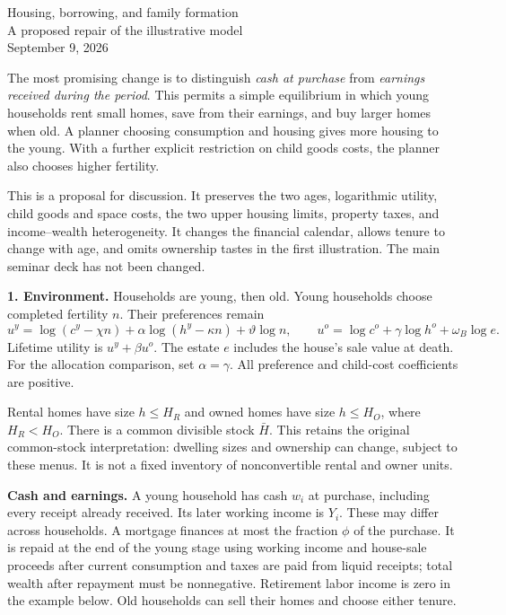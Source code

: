 \documentclass[11pt]{article}
\begin{document}
\begin{center}
{\Large Housing, borrowing, and family formation}\\[4pt]
{\large A proposed repair of the illustrative model}\\[4pt]
September 9, 2026
\end{center}

The most promising change is to distinguish \emph{cash at purchase} from
\emph{earnings received during the period}. This permits a simple equilibrium
in which young households rent small homes, save from their earnings, and buy
larger homes when old. A planner choosing consumption and housing gives more
housing to the young. With a further explicit restriction on child goods
costs, the planner also chooses higher fertility.

This is a proposal for discussion. It preserves the two ages, logarithmic
utility, child goods and space costs, the two upper housing limits, property
taxes, and income--wealth heterogeneity. It changes the financial calendar,
allows tenure to change with age, and omits ownership tastes in the first
illustration. The main seminar deck has not been changed.

\textbf{1. Environment.}
Households are young, then old. Young households choose completed fertility
$n$. Their preferences remain
\[
u^y=\log(c^y-\chi n)+\alpha\log(h^y-\kappa n)+\vartheta\log n,
\qquad
u^o=\log c^o+\gamma\log h^o+\omega_B\log e.
\]
Lifetime utility is $u^y+\beta u^o$. The estate $e$ includes the house's sale
value at death. For the allocation comparison, set $\alpha=\gamma$.
All preference and child-cost coefficients are positive.

Rental homes have size $h\le H_R$ and owned homes have size $h\le H_O$,
where $H_R<H_O$. There is a common divisible stock $\bar H$. This retains
the original common-stock interpretation: dwelling sizes and ownership
can change, subject to these menus. It is not a fixed inventory of
nonconvertible rental and owner units.

\textbf{Cash and earnings.}
A young household has cash $w_i$ at purchase, including every receipt already
received. Its later working income is $Y_i$. These may differ across
households. A mortgage finances at most the fraction $\phi$ of the purchase.
It is repaid at the end of the young stage using working income and house-sale
proceeds after current consumption and taxes are paid from liquid receipts;
total wealth after repayment must be nonnegative. Retirement labor income is
zero in the example below. Old households can sell their homes and choose
either tenure.
\end{document}
